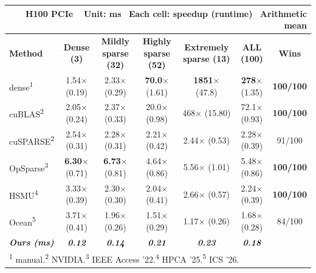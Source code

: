
\begin{table}[t]
\centering
\setlength{\tabcolsep}{5pt}
\renewcommand{\arraystretch}{1.2}
\begin{tabular}{l c c c c c c}
\multicolumn{7}{r}{\hfill \footnotesize\color{gray} \textbf{H100 PCIe} \,\,\, \textbf{Unit}: ms\,\,\, \textbf{Each cell}: speedup (runtime)\,\,\, \textbf{Arithmetic} mean}\\
\hline\hline
\textbf{Method} & \textbf{Dense (3)} & \textbf{Mildly sparse (32)} & \textbf{Highly sparse (52)} & \textbf{Extremely sparse (13)} & \textbf{ALL (100)} & \textbf{Wins}\\
\hline
dense\textsuperscript{1} & 1.54$\times$ {\small\color{gray}(0.19)} & 2.33$\times$ {\small\color{gray}(0.29)} & \textbf{70.0$\times$} {\small\color{gray}(1.61)} & \textbf{1851$\times$} {\small\color{gray}(47.8)} & \textbf{278$\times$} {\small\color{gray}(1.35)} & \textbf{100/100} \\
cuBLAS\textsuperscript{2} & 2.05$\times$ {\small\color{gray}(0.24)} & 2.37$\times$ {\small\color{gray}(0.33)} & 20.0$\times$ {\small\color{gray}(0.98)} & 468$\times$ {\small\color{gray}(15.80)} & 72.1$\times$ {\small\color{gray}(0.93)} & \textbf{100/100} \\
cuSPARSE\textsuperscript{2} & 2.54$\times$ {\small\color{gray}(0.31)} & 2.28$\times$ {\small\color{gray}(0.31)} & 2.21$\times$ {\small\color{gray}(0.42)} & 2.44$\times$ {\small\color{gray}(0.53)} & 2.28$\times$ {\small\color{gray}(0.39)} & 91/100 \\
OpSparse\textsuperscript{3} & \textbf{6.30$\times$} {\small\color{gray}(0.71)} & \textbf{6.73$\times$} {\small\color{gray}(0.81)} & 4.64$\times$ {\small\color{gray}(0.86)} & 5.56$\times$ {\small\color{gray}(1.01)} & 5.48$\times$ {\small\color{gray}(0.86)} & \textbf{100/100} \\
HSMU\textsuperscript{4} & 3.33$\times$ {\small\color{gray}(0.39)} & 2.30$\times$ {\small\color{gray}(0.30)} & 2.04$\times$ {\small\color{gray}(0.41)} & 2.66$\times$ {\small\color{gray}(0.57)} & 2.24$\times$ {\small\color{gray}(0.39)} & \textbf{100/100} \\
Ocean\textsuperscript{5} & 3.71$\times$ {\small\color{gray}(0.41)} & 1.96$\times$ {\small\color{gray}(0.26)} & 1.51$\times$ {\small\color{gray}(0.29)} & 1.17$\times$ {\small\color{gray}(0.26)} & 1.68$\times$ {\small\color{gray}(0.28)} & 84/100 \\
\textbf{\textit{Ours (ms)}} & \textbf{\textit{0.12}} & \textbf{\textit{0.14}} & \textbf{\textit{0.21}} & \textbf{\textit{0.23}} & \textbf{\textit{0.18}} &  \\
\hline\hline
\multicolumn{7}{l}{\footnotesize\color{gray} \textsuperscript{1} manual.\quad \textsuperscript{2} NVIDIA.\quad \textsuperscript{3} IEEE Access '22.\quad \textsuperscript{4} HPCA '25.\quad \textsuperscript{5} ICS '26.}
\end{tabular}
\end{table}



